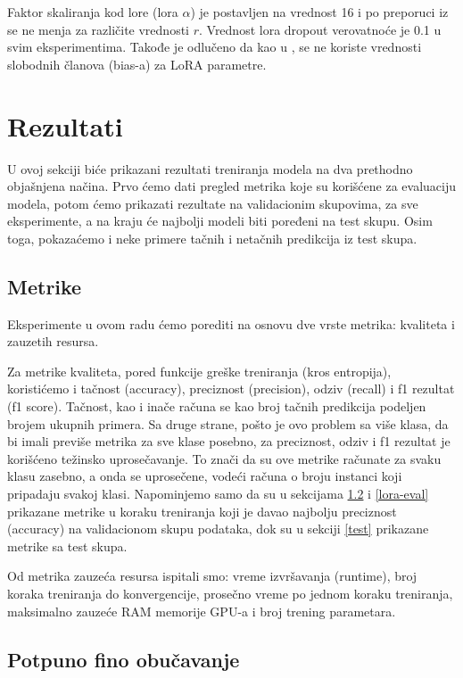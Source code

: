 \documentclass{article}
\theoremstyle{definition}
\begin{document}
	Faktor skaliranja kod lore (lora $\alpha$) je postavljen na vrednost 16 i po
	preporuci iz \cite{lora} se ne menja za različite vrednosti $r$. Vrednost 
	lora dropout verovatnoće je 0.1 u svim eksperimentima. Takođe je odlučeno
	da kao u \cite{lora}, se ne koriste vrednosti slobodnih članova (bias-a) za
	LoRA parametre.

	\section{Rezultati} \label{rezultati}
	U ovoj sekciji biće prikazani rezultati treniranja modela na dva prethodno 
	objašnjena načina. Prvo ćemo dati pregled 
	metrika koje su korišćene za evaluaciju modela, potom ćemo prikazati 
	rezultate na validacionim skupovima, za sve eksperimente, a na kraju će 
	najbolji modeli biti poređeni na test skupu. Osim toga, pokazaćemo i neke 
	primere tačnih i netačnih predikcija iz test skupa. 

	\subsection{Metrike}
	Eksperimente u ovom radu ćemo porediti na osnovu dve vrste metrika: kvaliteta
	i zauzetih resursa. 
	
	Za metrike kvaliteta, pored funkcije greške treniranja
	(kros entropija), koristićemo i tačnost (accuracy), preciznost (precision),
	odziv (recall) i f1 rezultat (f1 score). Tačnost, kao i inače računa se kao 
	broj tačnih predikcija podeljen brojem ukupnih primera. Sa druge strane, pošto 
	je ovo problem sa više klasa, da bi imali previše metrika za sve klase posebno,
	za preciznost, odziv i f1 rezultat je korišćeno težinsko uprosečavanje. To 
	znači da su ove metrike računate za svaku klasu zasebno, a onda se uprosečene,
	vodeći računa o broju instanci koji pripadaju svakoj klasi. Napominjemo samo
	da su u sekcijama \ref{ft-eval} i \ref{lora-eval} prikazane metrike u koraku
	treniranja koji je davao najbolju preciznost (accuracy) na validacionom 
	skupu podataka, dok su u sekciji \ref{test} prikazane metrike sa test skupa.

	Od metrika zauzeća resursa ispitali smo: vreme izvršavanja (runtime), broj 
	koraka treniranja do konvergencije, prosečno vreme po jednom koraku treniranja,
	maksimalno zauzeće RAM memorije GPU-a i broj trening parametara.
	
	\subsection{Potpuno fino obučavanje} \label{ft-eval}
	
\end{document}
